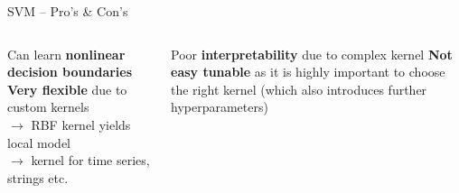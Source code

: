 \begin{frame}{SVM -- Pro's \& Con's}
\begin{columns}[b, totalwidth=\textwidth]
  \begin{column}{0.5\textwidth}    
    \begin{itemize}
       \positem Can learn \textbf{nonlinear decision boundaries}
       \positem \textbf{Very flexible} due to custom kernels \\
       $\rightarrow$ RBF kernel yields local model \\
       $\rightarrow$ kernel for time series, strings etc.
    \end{itemize}
  \end{column}

  \begin{column}{0.5\textwidth}

    \begin{itemize}
       \negitem Poor \textbf{interpretability} due to complex kernel
       \negitem \textbf{Not easy tunable} as it is highly important to choose the right kernel (which also introduces further hyperparameters)
    \end{itemize}
  \end{column}
\end{columns}


\end{frame}




